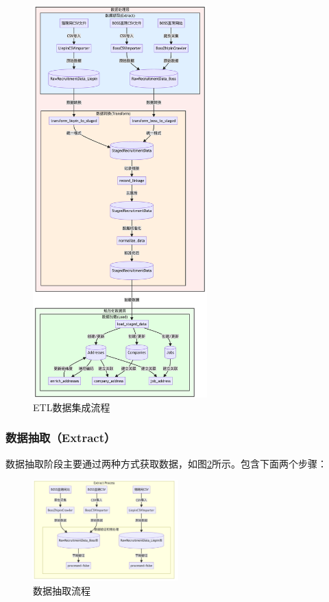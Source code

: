 \begin{figure}[htbp]
    \centering
    \includegraphics[width=0.6\textwidth]{figures/ETL.png}
    \caption{ETL数据集成流程}
    \label{fig:ETL}
\end{figure}

\subsubsection{数据抽取（Extract）}
数据抽取阶段主要通过两种方式获取数据，如图\ref{fig:ETL_extract}所示。包含下面两个步骤：

\begin{figure}[htbp]
    \centering
    \includegraphics[width=0.5\textwidth]{figures/extract.png}
    \caption{数据抽取流程}
    \label{fig:ETL_extract}
\end{figure}


